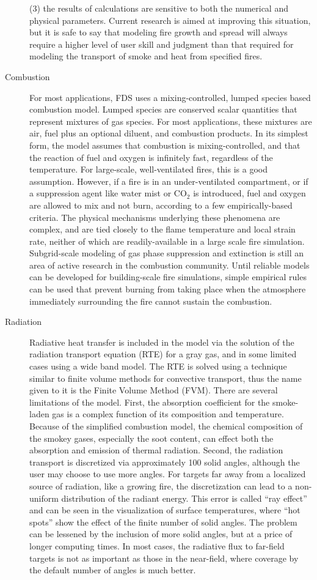 \documentclass[11pt]{book}
\begin{document}
\begin{description}
(3) the results of calculations are sensitive to both the numerical and physical parameters. Current research is aimed at improving this situation,
but it is safe to say that modeling fire growth and spread will always require a higher level of user skill and judgment than that required for
modeling the transport of smoke and heat from specified fires.
\item[Combustion]
For most applications, FDS uses a mixing-controlled, lumped species based combustion model. Lumped species are conserved scalar quantities that
represent mixtures of gas species.  For most applications, these mixtures are air, fuel plus an optional diluent, and combustion products.  In its
simplest form, the model assumes that combustion is mixing-controlled, and that the reaction of fuel and oxygen is infinitely fast, regardless of the
temperature. For large-scale, well-ventilated fires, this is a good assumption. However, if a fire is in an under-ventilated compartment, or if a
suppression agent like water mist or CO$_2$ is introduced, fuel and oxygen are allowed to mix and not burn, according to a few empirically-based
criteria. The physical mechanisms underlying these phenomena are complex, and are tied closely to the flame temperature and local strain rate,
neither of which are readily-available in a large scale fire simulation. Subgrid-scale modeling of gas phase suppression and extinction is still an
area of active research in the combustion community. Until reliable models can be developed for building-scale fire simulations, simple empirical
rules can be used that prevent burning from taking place when the atmosphere immediately surrounding the fire cannot sustain the combustion. 
\item[Radiation] Radiative heat transfer is included in the model via
the solution of the radiation transport equation (RTE) for a gray gas, and in some limited cases using a wide band model.  The RTE is solved using a
technique similar to finite volume methods for convective transport, thus the name given to it is the Finite Volume Method (FVM). There are several
limitations of the model. First, the absorption coefficient for the smoke-laden gas is a complex function of its composition and temperature. Because
of the simplified combustion model, the chemical composition of the smokey gases, especially the soot content, can effect both the absorption and
emission of thermal radiation.  Second, the radiation transport is discretized via approximately 100 solid angles, although the user may choose to
use more angles. For targets far away from a localized source of radiation, like a growing fire, the discretization can lead to a non-uniform
distribution of the radiant energy. This error is called ``ray effect'' and can be seen in the visualization of surface temperatures, where ``hot
spots'' show the effect of the finite number of solid angles. The problem can be lessened by the inclusion of more solid angles, but at a price of
longer computing times. In most cases, the radiative flux to far-field targets is not as important as those in the near-field, where coverage by the
default number of angles is much better.
\end{description}
\end{document}
